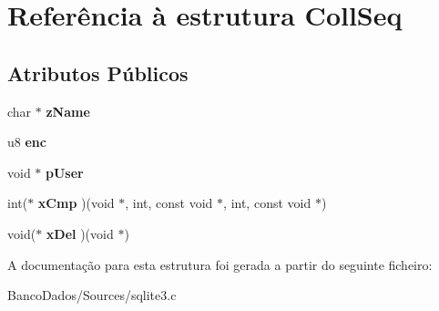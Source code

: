 \hypertarget{struct_coll_seq}{\section{Referência à estrutura Coll\-Seq}
\label{struct_coll_seq}
}
\subsection*{Atributos Públicos}
\begin{DoxyCompactItemize}
\item 
\hypertarget{struct_coll_seq_a48d6d5f71d4f8a3ab122903464e8b4a1}{char $\ast$ {\bfseries z\-Name}}\label{struct_coll_seq_a48d6d5f71d4f8a3ab122903464e8b4a1}

\item 
\hypertarget{struct_coll_seq_add27da1a70ed6f538447e9183eeb4838}{u8 {\bfseries enc}}\label{struct_coll_seq_add27da1a70ed6f538447e9183eeb4838}

\item 
\hypertarget{struct_coll_seq_a3cee924d41e730ccec7f686eb5b6f041}{void $\ast$ {\bfseries p\-User}}\label{struct_coll_seq_a3cee924d41e730ccec7f686eb5b6f041}

\item 
\hypertarget{struct_coll_seq_a47fc6d3a01eee354332ca515a8b493ce}{int($\ast$ {\bfseries x\-Cmp} )(void $\ast$, int, const void $\ast$, int, const void $\ast$)}\label{struct_coll_seq_a47fc6d3a01eee354332ca515a8b493ce}

\item 
\hypertarget{struct_coll_seq_a1c0dd3ad98c7bb2ef517f9170134a125}{void($\ast$ {\bfseries x\-Del} )(void $\ast$)}\label{struct_coll_seq_a1c0dd3ad98c7bb2ef517f9170134a125}

\end{DoxyCompactItemize}


A documentação para esta estrutura foi gerada a partir do seguinte ficheiro\-:\begin{DoxyCompactItemize}
\item 
Banco\-Dados/\-Sources/sqlite3.\-c\end{DoxyCompactItemize}
